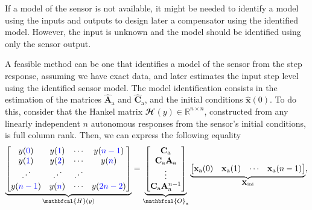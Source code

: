 If a model of the sensor is not available, it might be needed to identify a model using the inputs and outputs to design later a compensator using the identified model.
However, the input is unknown and the model should be identified using only the sensor output.


A feasible method can be one that identifies a model of the sensor from the step response, assuming we have exact data, and later estimates the input step level using the identified sensor model.
The model identification consists in the estimation of the matrices $\widehat{\mathbf{A}}_\text{a}$ and $\widehat{\mathbf{C}}_\text{a}$, and the initial conditions $\widehat{\mathbf{x}}(0)$.
To do this, consider that \color{blue}the \color{black} Hankel matrix $\mathbfcal{H}({y}) \in \mathbb{R}^{n \times n}$, constructed from any linearly independent $n$ autonomous responses from the sensor's initial conditions, is full column rank.
\color{blue}Then, \color{black} we can express \color{blue}the following equality\color{black}  
\begin{equation} \underbrace{ \begin{bmatrix} y(\color{blue}0\color{black}) & y(\color{blue}1\color{black}) & \cdots & y(\color{blue}n-1\color{black}) \\ y(\color{blue}1\color{black}) & y(\color{blue}2\color{black}) & \cdots & y(\color{blue}n\color{black}) \\ \iddots & \iddots & \iddots \\ y(\color{blue}n-1\color{black}) & y(\color{blue}n\color{black}) & \cdots & y(\color{blue}2n-2\color{black}) \end{bmatrix} }_{ \mathbfcal{H}({y}) }= \underbrace{ \begin{bmatrix} {\mathbf{C}}_\text{a} \\ {\mathbf{C}}_\text{a} {\mathbf{A}}_\text{a} \\ \vdots \\ {\mathbf{C}}_\text{a} {\mathbf{A}}_\text{a}^{n-1} \end{bmatrix} }_{ \mathbfcal{O}_\text{a} }  \underbrace{ \begin{bmatrix} \mathbf{x}_\text{a}(0) & \mathbf{x}_\text{a}(1) & \cdots & \mathbf{x}_\text{a}(n-1) \end{bmatrix} }_{ \mathbf{X}_\text{ini} } , \end{equation}

